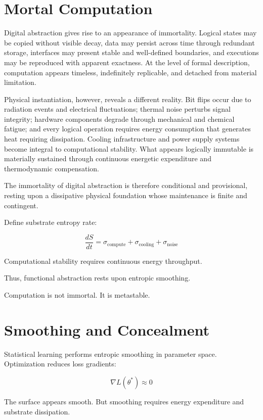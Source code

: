 \documentclass[11pt,openany]{book}
\begin{document}
\section{Mortal Computation}

Digital abstraction gives rise to an appearance of immortality. Logical states 
may be copied without visible decay, data may persist across time through 
redundant storage, interfaces may present stable and well-defined boundaries, 
and executions may be reproduced with apparent exactness. At the level of formal 
description, computation appears timeless, indefinitely replicable, and detached 
from material limitation.

Physical instantiation, however, reveals a different reality. Bit flips occur 
due to radiation events and electrical fluctuations; thermal noise perturbs 
signal integrity; hardware components degrade through mechanical and chemical 
fatigue; and every logical operation requires energy consumption that generates 
heat requiring dissipation. Cooling infrastructure and power supply systems 
become integral to computational stability. What appears logically immutable 
is materially sustained through continuous energetic expenditure and 
thermodynamic compensation.

The immortality of digital abstraction is therefore conditional and provisional, 
resting upon a dissipative physical foundation whose maintenance is finite 
and contingent.

Define substrate entropy rate:

\[
\frac{dS}{dt} = \sigma_{\text{compute}} + \sigma_{\text{cooling}} + \sigma_{\text{noise}}
\]

Computational stability requires continuous energy throughput.

Thus, functional abstraction rests upon entropic smoothing.

Computation is not immortal.
It is metastable.

\section{Smoothing and Concealment}

Statistical learning performs entropic smoothing in parameter space.
Optimization reduces loss gradients:

\[
\nabla L(\theta^*) \approx 0
\]

The surface appears smooth.
But smoothing requires energy expenditure and substrate dissipation.
\end{document}
